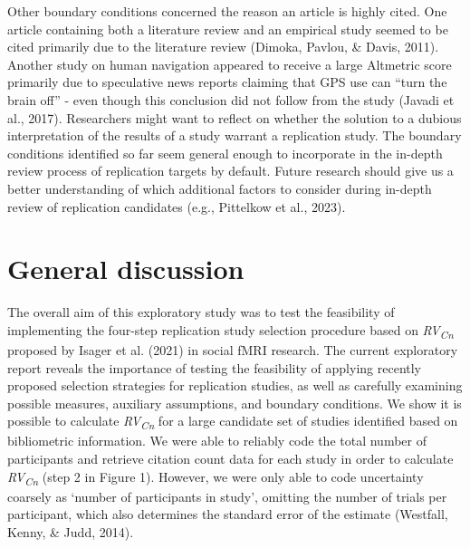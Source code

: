 \documentclass[
  man,floatsintext]{apa6}
\begin{document}
Other boundary conditions concerned the reason an article is highly cited. One article containing both a literature review and an empirical study seemed to be cited primarily due to the literature review (Dimoka, Pavlou, \& Davis, 2011). Another study on human navigation appeared to receive a large Altmetric score primarily due to speculative news reports claiming that GPS use can ``turn the brain off'' - even though this conclusion did not follow from the study (Javadi et al., 2017). Researchers might want to reflect on whether the solution to a dubious interpretation of the results of a study warrant a replication study. The boundary conditions identified so far seem general enough to incorporate in the in-depth review process of replication targets by default. Future research should give us a better understanding of which additional factors to consider during in-depth review of replication candidates (e.g., Pittelkow et al., 2023).

\hypertarget{general-discussion}{%
\section{General discussion}\label{general-discussion}}

The overall aim of this exploratory study was to test the feasibility of implementing the four-step replication study selection procedure based on \emph{RV\textsubscript{Cn}} proposed by Isager et al. (2021) in social fMRI research. The current exploratory report reveals the importance of testing the feasibility of applying recently proposed selection strategies for replication studies, as well as carefully examining possible measures, auxiliary assumptions, and boundary conditions. We show it is possible to calculate \emph{RV\textsubscript{Cn}} for a large candidate set of studies identified based on bibliometric information. We were able to reliably code the total number of participants and retrieve citation count data for each study in order to calculate \emph{RV\textsubscript{Cn}} (step 2 in Figure 1). However, we were only able to code uncertainty coarsely as `number of participants in study', omitting the number of trials per participant, which also determines the standard error of the estimate (Westfall, Kenny, \& Judd, 2014).
\end{document}
